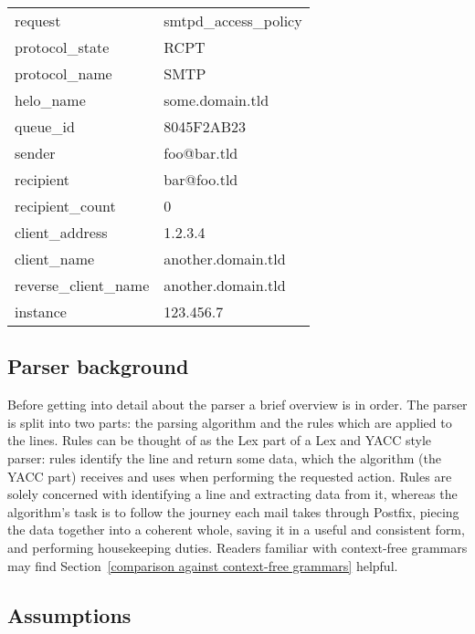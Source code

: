 \documentclass[a4paper,12pt,draft]{article}
\begin{document}
\begin{tabular}[]{ll}

    request                 & smtpd\_access\_policy     \\
    protocol\_state         & RCPT                      \\
    protocol\_name          & SMTP                      \\
    helo\_name              & some.domain.tld           \\
    queue\_id               & 8045F2AB23                \\
    sender                  & foo@bar.tld               \\
    recipient               & bar@foo.tld               \\
    recipient\_count        & 0                         \\
    client\_address         & 1.2.3.4                   \\
    client\_name            & another.domain.tld        \\
    reverse\_client\_name   & another.domain.tld        \\
    instance                & 123.456.7                 \\

\end{tabular}



\subsection{Parser background}

Before getting into detail about the parser a brief overview is in order.
The parser is split into two parts: the parsing algorithm and the rules
which are applied to the lines.  Rules can be thought of as the Lex part of
a Lex and YACC style parser: rules identify the line and return some data,
which the algorithm (the YACC part) receives and uses when performing the
requested action.  Rules are solely concerned with identifying a line and
extracting data from it, whereas the algorithm's task is to follow the
journey each mail takes through Postfix, piecing the data together into a
coherent whole, saving it in a useful and consistent form, and performing
housekeeping duties.  Readers familiar with context-free grammars may find
Section~\ref{comparison against context-free grammars} helpful.

\subsection{Assumptions}
\end{document}
